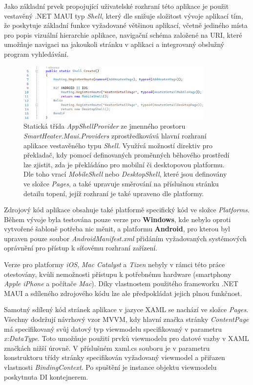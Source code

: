Jako základní prvek propojující uživatelské rozhraní této aplikace je použit vestavěný .NET MAUI typ {\it Shell}, který dle \cite{maui-shell} snižuje složitost vývoje aplikací tím, že poskytuje základní funkce vyžadované většinou aplikací, včetně jediného místa pro popis vizuální hierarchie aplikace, navigační schéma založené na URI, které umožňuje navigaci na jakoukoli stránku v aplikaci a integrovaný obslužný program vyhledávání.

\begin{figure}[hbt]
\label{appshellprovider}
\includegraphics[width=0.87\textwidth]{obrazky-figures/code-maui-appshellprovider.png}
\caption{Statická třída {\it AppShellProvider} ze jmenného prostoru {\it SmartHeater.Maui.Providers} zprostředkovává hlavní rozhraní aplikace vestavěného typu {\it Shell}. Využívá možností direktiv pro překladač, kdy pomocí definovaných proměnných běhového prostředí lze zjistit, zda je překládáno pro mobilní či desktopovou platformu. Dle toho vrací {\it MobileShell} nebo {\it DesktopShell}, které jsou definovány ve složce {\it Pages}, a také upravuje směrování na příslušnou stránku detailu topení, jejíž rozhraní je také upraveno dle platformy.}
\end{figure}

Zdrojový kód aplikace obsahuje také platformě specifický kód ve složce {\it Platforms}. Během vývoje byla testována pouze verze pro \textbf{Windows}, kde nebylo oproti vytvořené šabloně potřeba nic měnit, a platformu \textbf{Android}, pro kterou byl upraven pouze soubor {\it AndroidManifest.xml} přidáním vyžadovaných systémových oprávnění pro přístup k síťovému rozhraní zařízení.

Verze pro platformy {\it iOS}, {\it Mac Catalyst} a {\it Tizen} nebyly v rámci této práce otestovány, kvůli nemožnosti přístupu k potřebnému hardware (smartphony {\it Apple iPhone} a počítače {\it Mac}). Díky vlastnostem použitého frameworku .NET MAUI a sdíleného zdrojového kódu lze ale předpokládat jejich plnou funkčnost.

Samotný sdílený kód stránek aplikace v jazyce XAML se nachází ve složce {\it Pages}. Všechny dodržují návrhový vzor MVVM, kdy hlavní značka stránky {\it ContentPage} má specifikovaný svůj datový typ viewmodelu specifikovaný v parametru {\it x:DataType}. Toto umožňuje použití prvků viewmodelu pro datové vazby v XAML značkách nižší úrovně. V příslušném xaml.cs souboru je v parametru konstruktoru třídy stránky specifikován vyžadovaný viewmodel a přiřazen vlastnosti {\it BindingContext}. Po spuštění je instance objektu viewmodelu poskytnuta DI kontejnerem.

